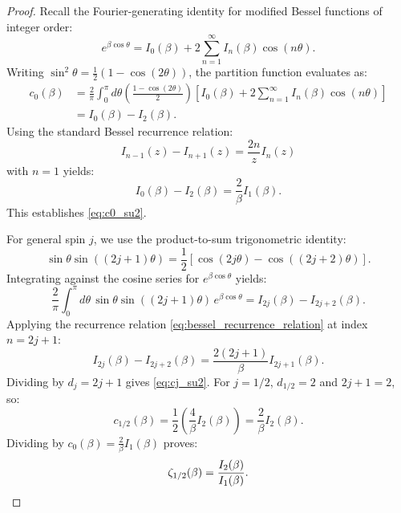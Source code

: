 \begin{proof}
Recall the Fourier-generating identity for modified Bessel functions of integer order:
\begin{equation}
e^{\beta \cos\theta} = I_0(\beta) + 2 \sum_{n=1}^\infty I_n(\beta) \cos(n\theta).
\end{equation}
Writing $\sin^2\theta = \frac{1}{2}(1 - \cos(2\theta))$, the partition function evaluates as:
\begin{align}
c_0(\beta) &= \frac{2}{\pi} \int_0^\pi d\theta \left( \frac{1 - \cos(2\theta)}{2} \right) \left[ I_0(\beta) + 2 \sum_{n=1}^\infty I_n(\beta) \cos(n\theta) \right] \nonumber \\
&= I_0(\beta) - I_2(\beta).
\end{align}
Using the standard Bessel recurrence relation:
\begin{equation}
\label{eq:bessel_recurrence_relation}
I_{n-1}(z) - I_{n+1}(z) = \frac{2n}{z} I_n(z)
\end{equation}
with $n=1$ yields:
\begin{equation}
I_0(\beta) - I_2(\beta) = \frac{2}{\beta} I_1(\beta).
\end{equation}
This establishes \eqref{eq:c0_su2}.

For general spin $j$, we use the product-to-sum trigonometric identity:
\begin{equation}
\sin\theta \sin((2j+1)\theta) = \frac{1}{2} \left[ \cos(2j\theta) - \cos((2j+2)\theta) \right].
\end{equation}
Integrating against the cosine series for $e^{\beta \cos\theta}$ yields:
\begin{equation}
\frac{2}{\pi} \int_0^\pi d\theta \, \sin\theta \sin((2j+1)\theta) \, e^{\beta \cos\theta} = I_{2j}(\beta) - I_{2j+2}(\beta).
\end{equation}
Applying the recurrence relation \eqref{eq:bessel_recurrence_relation} at index $n = 2j+1$:
\begin{equation}
I_{2j}(\beta) - I_{2j+2}(\beta) = \frac{2(2j+1)}{\beta} I_{2j+1}(\beta).
\end{equation}
Dividing by $d_j = 2j+1$ gives \eqref{eq:cj_su2}. For $j = 1/2$, $d_{1/2} = 2$ and $2j+1 = 2$, so:
\begin{equation}
c_{1/2}(\beta) = \frac{1}{2} \left( \frac{4}{\beta} I_2(\beta) \right) = \frac{2}{\beta} I_2(\beta).
\end{equation}
Dividing by $c_0(\beta) = \frac{2}{\beta} I_1(\beta)$ proves:
\begin{equation}
\zeta_{1/2}(\beta) = \frac{I_2(\beta)}{I_1(\beta)}. \qedhere
\end{equation}
\end{proof}

